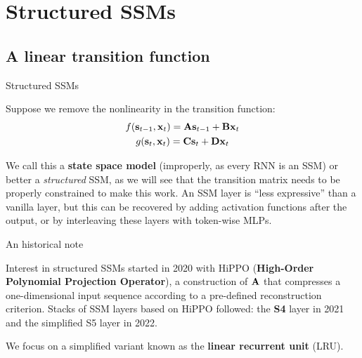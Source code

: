 \documentclass[11pt,aspectratio=169]{beamer}
\begin{document}
\section{Structured SSMs}
\subsection{A linear transition function}

\begin{frame}{Structured SSMs}
    \setlength{\parskip}{6pt}

    Suppose we remove the nonlinearity in the transition function:
    \begin{gather*}
        f(\boldsymbol{\mathbf{s}}_{t-1},\boldsymbol{\mathbf{x}}_t)=\boldsymbol{\mathbf{A}}\boldsymbol{\mathbf{s}}_{t-1}+\boldsymbol{\mathbf{B}}\boldsymbol{\mathbf{x}}_t \\
        g(\boldsymbol{\mathbf{s}}_t,\boldsymbol{\mathbf{x}}_t)=\boldsymbol{\mathbf{C}}\boldsymbol{\mathbf{s}}_t+\boldsymbol{\mathbf{D}}\boldsymbol{\mathbf{x}}_t
    \end{gather*}

    We call this a \textbf{state space model} (improperly, as every RNN is an
    SSM) or better a \textit{structured} SSM, as we will see that the
    transition matrix needs to be properly constrained to make this work. An
    SSM layer is ``less expressive'' than a vanilla layer, but this can be
    recovered by adding activation functions after the output, or by
    interleaving these layers with token-wise MLPs.


\end{frame}

\begin{frame}{An historical note}
    \setlength{\parskip}{6pt}

    Interest in structured SSMs started in 2020 with HiPPO
    (\textbf{High-Order Polynomial Projection Operator}), a construction of
    $\boldsymbol{\mathbf{A}}$ that compresses a one-dimensional input sequence according to a
    pre-defined reconstruction criterion. Stacks of SSM layers based on HiPPO
    followed: the \textbf{S4} layer in 2021 and the simplified S5 layer in
    2022.

    We focus on a simplified variant known as the \textbf{linear recurrent
    unit} (LRU).


\end{frame}
\end{document}
